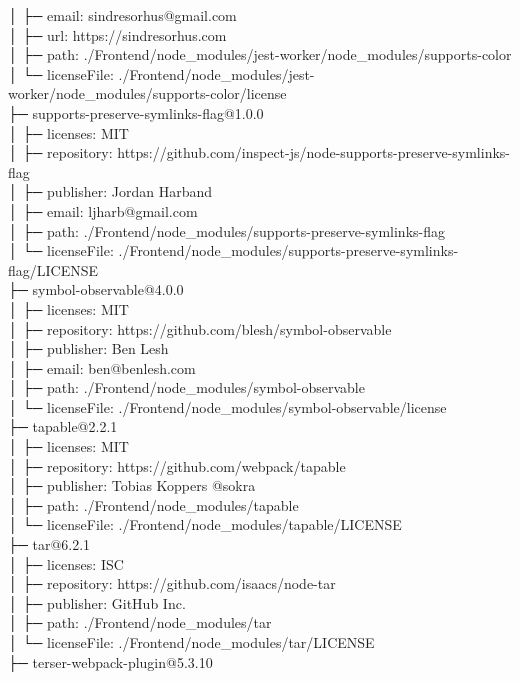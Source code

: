 │  ├─ email: sindresorhus@gmail.com\\
│  ├─ url: https://sindresorhus.com\\
│  ├─ path: ./Frontend/node\_modules/jest-worker/node\_modules/supports-color\\
│  └─ licenseFile: ./Frontend/node\_modules/jest-worker/node\_modules/supports-color/license\\
├─ supports-preserve-symlinks-flag@1.0.0\\
│  ├─ licenses: MIT\\
│  ├─ repository: https://github.com/inspect-js/node-supports-preserve-symlinks-flag\\
│  ├─ publisher: Jordan Harband\\
│  ├─ email: ljharb@gmail.com\\
│  ├─ path: ./Frontend/node\_modules/supports-preserve-symlinks-flag\\
│  └─ licenseFile: ./Frontend/node\_modules/supports-preserve-symlinks-flag/LICENSE\\
├─ symbol-observable@4.0.0\\
│  ├─ licenses: MIT\\
│  ├─ repository: https://github.com/blesh/symbol-observable\\
│  ├─ publisher: Ben Lesh\\
│  ├─ email: ben@benlesh.com\\
│  ├─ path: ./Frontend/node\_modules/symbol-observable\\
│  └─ licenseFile: ./Frontend/node\_modules/symbol-observable/license\\
├─ tapable@2.2.1\\
│  ├─ licenses: MIT\\
│  ├─ repository: https://github.com/webpack/tapable\\
│  ├─ publisher: Tobias Koppers @sokra\\
│  ├─ path: ./Frontend/node\_modules/tapable\\
│  └─ licenseFile: ./Frontend/node\_modules/tapable/LICENSE\\
├─ tar@6.2.1\\
│  ├─ licenses: ISC\\
│  ├─ repository: https://github.com/isaacs/node-tar\\
│  ├─ publisher: GitHub Inc.\\
│  ├─ path: ./Frontend/node\_modules/tar\\
│  └─ licenseFile: ./Frontend/node\_modules/tar/LICENSE\\
├─ terser-webpack-plugin@5.3.10\\
